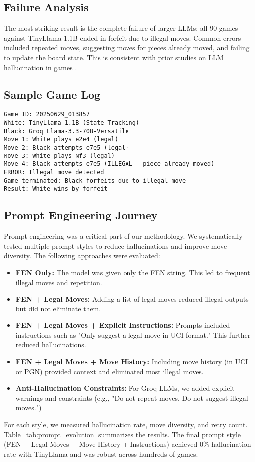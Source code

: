 \documentclass[conference]{IEEEtran}
\begin{document}
\subsection{Failure Analysis}
The most striking result is the complete failure of larger LLMs: all 90 games against TinyLlama-1.1B ended in forfeit due to illegal moves. Common errors included repeated moves, suggesting moves for pieces already moved, and failing to update the board state. This is consistent with prior studies on LLM hallucination in games \cite{llm_chess_hallucination_study_1, llm_chess_hallucination_study_2, llm_chess_hallucination_study_3, llm_chess_hallucination_study_4}.

\subsection{Sample Game Log}
\begin{lstlisting}
Game ID: 20250629_013857
White: TinyLlama-1.1B (State Tracking)
Black: Groq Llama-3.3-70B-Versatile
Move 1: White plays e2e4 (legal)
Move 2: Black attempts e7e5 (legal)
Move 3: White plays Nf3 (legal)
Move 4: Black attempts e7e5 (ILLEGAL - piece already moved)
ERROR: Illegal move detected
Game terminated: Black forfeits due to illegal move
Result: White wins by forfeit
\end{lstlisting}

\subsection{Prompt Engineering Journey}
Prompt engineering was a critical part of our methodology. We systematically tested multiple prompt styles to reduce hallucinations and improve move diversity. The following approaches were evaluated:
\begin{itemize}
    \item \textbf{FEN Only:} The model was given only the FEN string. This led to frequent illegal moves and repetition.
    \item \textbf{FEN + Legal Moves:} Adding a list of legal moves reduced illegal outputs but did not eliminate them.
    \item \textbf{FEN + Legal Moves + Explicit Instructions:} Prompts included instructions such as "Only suggest a legal move in UCI format." This further reduced hallucinations.
    \item \textbf{FEN + Legal Moves + Move History:} Including move history (in UCI or PGN) provided context and eliminated most illegal moves.
    \item \textbf{Anti-Hallucination Constraints:} For Groq LLMs, we added explicit warnings and constraints (e.g., "Do not repeat moves. Do not suggest illegal moves.")
\end{itemize}
For each style, we measured hallucination rate, move diversity, and retry count. Table~\ref{tab:prompt_evolution} summarizes the results. The final prompt style (FEN + Legal Moves + Move History + Instructions) achieved 0\% hallucination rate with TinyLlama and was robust across hundreds of games.
\end{document}
